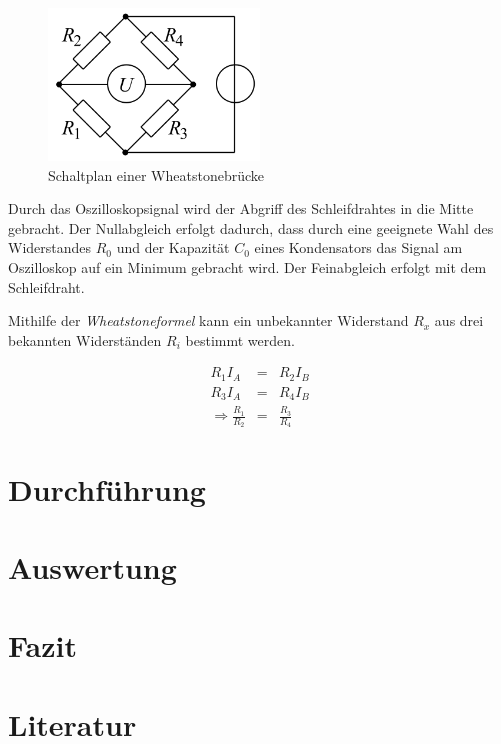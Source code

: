 \documentclass[12pt,a4paper]{scrartcl}
\numberwithin{equation}{section} %
\begin{document}
\begin{figure}[h!]
	\centering
	\includegraphics[width=0.5\textwidth]{../media/B1.5/WhBr_Diagonalbild.png}
	\caption{Schaltplan einer Wheatstonebrücke \cite{File:WhBr_Diagonalbild}}
\end{figure}

Durch das Oszilloskopsignal wird der Abgriff des Schleifdrahtes in die
Mitte gebracht. Der Nullabgleich erfolgt dadurch, dass durch eine
geeignete Wahl des Widerstandes $R_0$ und der Kapazität $C_0$ eines
Kondensators das Signal am Oszilloskop auf ein Minimum gebracht wird.
Der Feinabgleich erfolgt mit dem Schleifdraht.

Mithilfe der \emph{Wheatstoneformel} kann ein unbekannter Widerstand
$R_x$ aus drei bekannten Widerständen $R_i$ bestimmt werden.

\begin{eqnarray}
    R_1 I_A &=& R_2 I_B \\
    R_3 I_A &=& R_4 I_B \\
    \Rightarrow \frac{R_1}{R_2} &=& \frac{R_3}{R_4}
\end{eqnarray}

\clearpage
\hypertarget{durchfuxfchrung}{%
\section{Durchführung}\label{durchfuxfchrung}}

\clearpage
\hypertarget{auswertung}{%
\section{Auswertung}\label{auswertung}}

\clearpage
\hypertarget{fazit}{%
\section{Fazit}\label{fazit}}

\clearpage
\hypertarget{literatur}{%
\section{Literatur}\label{literatur}}
\renewcommand{\section}[2]{}
\end{document}
